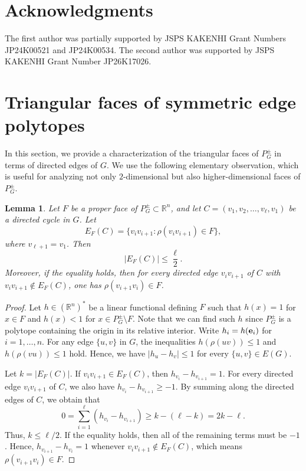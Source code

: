 \documentclass[11pt,a4paper]{amsart}
\newtheorem{lemma}[theorem]{Lemma}
\theoremstyle{definition}
\theoremstyle{remark}
\newcommand{\RR}{\mathbb R}
\newcommand{\eb}{{\bf e}}
\begin{document}
{\medskip

\section*{Acknowledgments}
The first author was partially supported by JSPS KAKENHI Grant Numbers JP24K00521 and JP24K00534. 
The second author was supported by JSPS KAKENHI Grant Number JP26K17026.


\bigskip
\section{Triangular faces of symmetric edge polytopes}\label{sec:triangles}

In this section, we provide a characterization of the triangular faces of $P_G^{\pm}$ in terms of directed edges of $G$.
We use the following elementary observation, which is useful for analyzing not only $2$-dimensional  but also higher-dimensional faces of $P_G^\pm$.  
\begin{lemma}\label{lem:cycle-face-obstruction}
Let $F$ be a proper face of $P_G^{\pm} \subset \RR^n$, and let $C=(v_1,v_2,\ldots,v_\ell,v_1)$ be a directed cycle in $G$. 
Let \[E_F(C)=\{v_i v_{i+1}:\rho(v_i v_{i+1})\in F\},\] where $v_{\ell+1}=v_1$. Then \[|E_F(C)|\le \frac{\ell}{2}.\] 
Moreover, if the equality holds, then for every directed edge $v_i v_{i+1}$ of $C$ with $v_i v_{i+1}\notin E_F(C)$, one has $\rho(v_{i+1}v_i)\in F$. 
\end{lemma}
\begin{proof}
Let $h\in (\RR^n)^*$ be a linear functional defining $F$ such that $h(x)=1$ for $x\in F$ and $h(x)<1$ for $x\in P_G^{\pm}\setminus F$. 
Note that we can find such $h$ since $P_G^\pm$ is a polytope containing the origin in its relative interior. 
Write $h_i=h(\eb_i)$ for $i=1,\ldots,n$. For any edge $\{u,v\}$ in $G$, the inequalities $h(\rho(uv))\le 1$ and $h(\rho(vu)) \le 1$ hold. 
Hence, we have $|h_u-h_v|\le 1$ for every $\{u,v\}\in E(G)$. 

Let $k=|E_F(C)|$. If $v_i v_{i+1}\in E_F(C)$, then $h_{v_i}-h_{v_{i+1}}=1$. 
For every directed edge $v_i v_{i+1}$ of $C$, we also have $h_{v_i}-h_{v_{i+1}}\ge -1$. By summing along the directed edges of $C$, we obtain that 
\[0=\sum_{i=1}^{\ell}(h_{v_i}-h_{v_{i+1}})\ge k-(\ell-k)=2k-\ell.\]
Thus, $k\le \ell/2$. If the equality holds, then all of the remaining terms must be $-1$. 
Hence, $h_{v_{i+1}}-h_{v_i}=1$ whenever $v_i v_{i+1}\notin E_F(C)$, which means $\rho(v_{i+1}v_i)\in F$. 
\end{proof}

}
\end{document}
